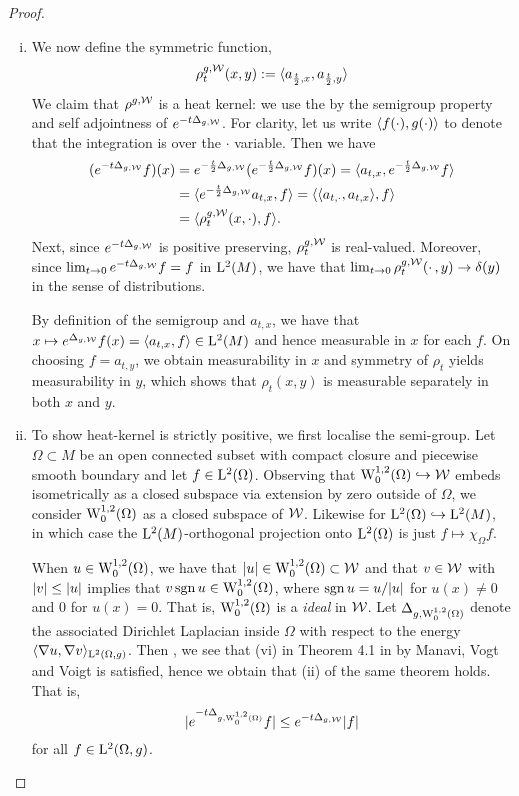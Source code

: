 \documentclass[a4paper, 12pt]{amsart}
\begin{document}
\begin{proof}
\begin{enumerate}[(i)]
\item We now define the symmetric function,
  $$\hk^{g,\cW}_t(x,y) := \inprod{a_{\frac{t}{2}, x}, a_{\frac{t}{2}, y}}$$
        We claim that \(\hk^{g,\cW}\) is a heat kernel: we use the by the semigroup property and self adjointness of \(e^{-t\Delta_{g,\cW}}\). For clarity, let us write \(\inprod{f(\cdot), g(\cdot)}\) to denote that the integration is over the \(\cdot\) variable. Then we have
	\[
        \begin{split}
        (e^{-t \Delta_{g,\cW}}f) (x) &= e^{-\frac{t}{2} \Delta_{g,\cW}} (e^{-\frac{t}{2} \Delta_{g,\cW}} f) (x) = \inprod{a_{t,x}, e^{-\frac{t}{2} \Delta_{g,\cW}} f} \\
        &= \inprod{e^{-\frac{t}{2} \Delta_{g,\cW}} a_{t,x}, f} = \inprod{\inprod{a_{t,\cdot}, a_{t,x}}, f} \\
        &= \inprod{\hk^{g,\cW}_t(x,\cdot), f}.
        \end{split}
        \]
        Next, since $e^{-t \Delta_{g,\cW}}$	is positive preserving, $\hk_t^{g,\cW}$ is real-valued. Moreover, since $\lim_{t\to 0} e^{-t\Delta_{g,\cW}}f = f$ in $\Lp{2}(M)$, we have that $\lim_{t \to 0} \hk^{g,\cW}_t(\mdot,y) \to  \delta(y)$ in the sense of distributions.

        By definition of the semigroup and $a_{t,x}$, we have that $x\mapsto e^{\Delta_{g,\cW}}f(x) = \inprod{a_{t,x},f} \in \Lp{2}(M)$
	and hence measurable in $x$ for each $f$. 
	On choosing \(f = a_{t,y}\), we obtain 
	measurability in \(x\) and symmetry of \(\rho_t\) yields measurability in \(y\),
	which shows that \(\rho_t(x, y)\) is measurable separately in both \(x\) and \(y\). 

\item To show heat-kernel is strictly positive, we first localise the semi-group.
	Let $\Omega \subset M$ be an open connected subset with compact closure and piecewise smooth boundary  and let $f \in \Lp{2}(\Omega)$.
	Observing that $\SobH[0]{1}(\Omega) \embed \cW$ embeds isometrically as a closed subspace via extension by zero outside of $\Omega$, we consider \(\SobH[0]{1}(\Omega)\) as a closed subspace of $\cW$. Likewise for $\Lp{2}(\Omega) \embed \Lp{2}(M)$, in which case the $\Lp{2}(M)$-orthogonal projection onto $\Lp{2}(\Omega)$ is just $f \mapsto \chi_{\Omega} f$.

        When $u \in \SobH[0]{1}(\Omega)$, we have that $\modulus{u} \in \SobH[0]{1}(\Omega) \subset \cW$ and that $v \in \cW$ with $\modulus{v} \leq \modulus{u}$ implies that $v \sgn u \in \SobH[0]{1}(\Omega)$,
	where $\sgn u = u/\modulus{u}$ for $u(x) \neq 0$ and $0$ for $u(x) = 0$. That is, $\SobH[0]{1}(\Omega)$ is a \emph{ideal} in $\cW$. Let $\Delta_{g,\SobH[0]{1}(\Omega)}$ denote the associated Dirichlet Laplacian inside $\Omega$ with respect to the energy $\inprod{\nabla u, \nabla v}_{\Lp{2}(\Omega, g)}$. Then , we see that (vi) in Theorem 4.1 in \cite{MVV} by Manavi, Vogt and Voigt is satisfied, hence we obtain that (ii) of the same theorem holds. That is,
 	$$ \modulus{e^{-t\Delta_{g, \SobH[0]{1}(\Omega)}} f} \leq e^{-t \Delta_{g, \cW}} \modulus{f}$$
	for all $f \in \Lp{2}(\Omega,g)$.


\end{enumerate}
\end{proof}
\end{document}
